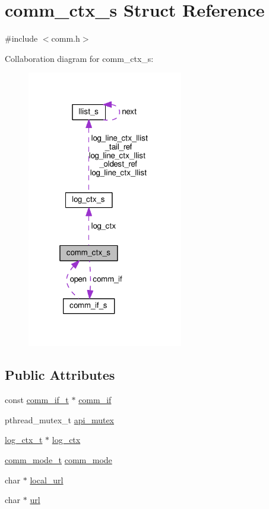 \hypertarget{structcomm__ctx__s}{}\section{comm\+\_\+ctx\+\_\+s Struct Reference}
\label{structcomm__ctx__s}


{\ttfamily \#include $<$comm.\+h$>$}



Collaboration diagram for comm\+\_\+ctx\+\_\+s\+:\nopagebreak
\begin{figure}[H]
\begin{center}
\leavevmode
\includegraphics[width=193pt]{structcomm__ctx__s__coll__graph}
\end{center}
\end{figure}
\subsection*{Public Attributes}
\begin{DoxyCompactItemize}
\item 
const \hyperlink{comm_8h_a0d96b9368107e517ea8253837384faf5}{comm\+\_\+if\+\_\+t} $\ast$ \hyperlink{structcomm__ctx__s_ada6c987982f09f27479ce375b5050534}{comm\+\_\+if}
\item 
pthread\+\_\+mutex\+\_\+t \hyperlink{structcomm__ctx__s_a87f4bc5b93d50488325c43f384cb9d61}{api\+\_\+mutex}
\item 
\hyperlink{structlog__ctx__s}{log\+\_\+ctx\+\_\+t} $\ast$ \hyperlink{structcomm__ctx__s_a8ac71b7c3edcbbf9eb98f8668f9fe572}{log\+\_\+ctx}
\item 
\hyperlink{comm_8h_a2604d892f8ab29dfc96bd68e2cc3086f}{comm\+\_\+mode\+\_\+t} \hyperlink{structcomm__ctx__s_a8e47d99809ed21c0d63e53529b3d0596}{comm\+\_\+mode}
\item 
char $\ast$ \hyperlink{structcomm__ctx__s_afa1c9d723a19d1ec55d4ff2e9f8d17e0}{local\+\_\+url}
\item 
char $\ast$ \hyperlink{structcomm__ctx__s_aa5fe745b2131be751f5a0e4528c946d3}{url}
\end{DoxyCompactItemize}


